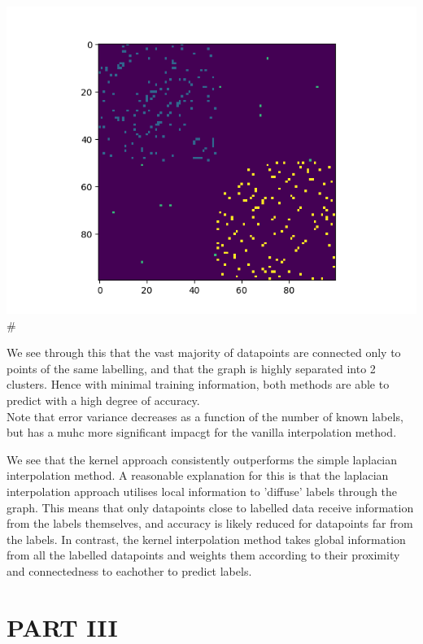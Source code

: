 \documentclass[12pt]{article}
\begin{document}
\includegraphics{outputs/part2/graph_label_diagram.png}#

We see through this that the vast majority of datapoints are connected only to points
of the same labelling, and that the graph is highly separated  into 2 clusters.
Hence with minimal training information, both methods are able to predict with a
 high degree of accuracy.\\

Note that error variance decreases as a function of the number of known labels, but 
has a muhc more significant impacgt for the vanilla interpolation method.


We see that the kernel approach consistently outperforms the simple laplacian
 interpolation method. A reasonable explanation for this is that the laplacian
interpolation approach utilises local information to 'diffuse' labels through the graph. 
This means that only datapoints close to labelled data receive information from the 
labels themselves, and accuracy is likely reduced for datapoints far from the labels.
In contrast, the kernel interpolation method takes global information from all the 
labelled datapoints and weights them according to their proximity and connectedness 
to eachother to predict labels.
\newpage



\section{PART III}
\end{document}
